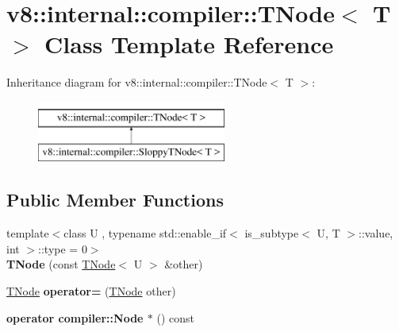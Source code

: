 \hypertarget{classv8_1_1internal_1_1compiler_1_1TNode}{}\section{v8\+:\+:internal\+:\+:compiler\+:\+:T\+Node$<$ T $>$ Class Template Reference}
\label{classv8_1_1internal_1_1compiler_1_1TNode}
Inheritance diagram for v8\+:\+:internal\+:\+:compiler\+:\+:T\+Node$<$ T $>$\+:\begin{figure}[H]
\begin{center}
\leavevmode
\includegraphics[height=2.000000cm]{classv8_1_1internal_1_1compiler_1_1TNode}
\end{center}
\end{figure}
\subsection*{Public Member Functions}
\begin{DoxyCompactItemize}
\item 
\mbox{\label{classv8_1_1internal_1_1compiler_1_1TNode_a4209b67a0c0a410a018c72ffedc26e8a}} 
{\footnotesize template$<$class U , typename std\+::enable\+\_\+if$<$ is\+\_\+subtype$<$ U, T $>$\+::value, int $>$\+::type  = 0$>$ }\\{\bfseries T\+Node} (const \mbox{\hyperlink{classv8_1_1internal_1_1compiler_1_1TNode}{T\+Node}}$<$ U $>$ \&other)
\item 
\mbox{\label{classv8_1_1internal_1_1compiler_1_1TNode_ad95f4c0dc789e10b94f53f3ea8870aa4}} 
\mbox{\hyperlink{classv8_1_1internal_1_1compiler_1_1TNode}{T\+Node}} {\bfseries operator=} (\mbox{\hyperlink{classv8_1_1internal_1_1compiler_1_1TNode}{T\+Node}} other)
\item 
\mbox{\label{classv8_1_1internal_1_1compiler_1_1TNode_af878952cf56ebf57671fa096d9d9db42}} 
{\bfseries operator compiler\+::\+Node $\ast$} () const
\end{DoxyCompactItemize}
